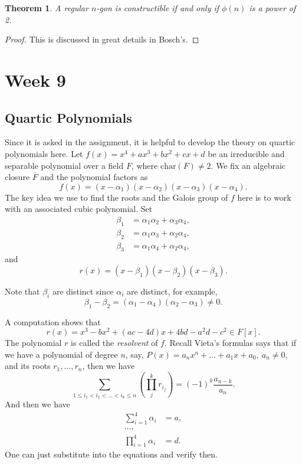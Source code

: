 \documentclass[12pt]{report}
\newtheorem{theorem}{Theorem}[section]
\theoremstyle{definition}
\newcommand{\charr}{\text{char}}
\begin{document}
\begin{theorem}
	A regular $n$-gon is constructible if and only if $\phi(n)$ is a power of 2.
\end{theorem}

\begin{proof}
	This is discussed in great details in Bosch's.
\end{proof}

\chapter*{Week 9}
\setcounter{chapter}{9}

\section{Quartic Polynomials}

Since it is asked in the assignment, it is helpful to develop the theory on quartic polynomials here. Let $f(x)=x^4+ax^3+bx^2+cx+d$ be an irreducible and separable polynomial over a field $F$, where $\charr(F)\not=2$. We fix an algebraic closure $\overline{F}$ and the polynomial factors as \[f(x)=(x-\alpha_1)(x-\alpha_2)(x-\alpha_3)(x-\alpha_4).\]
The key idea we use to find the roots and the Galois group of $f$ here is to work with an associated cubic polynomial. Set
\begin{align*}
	\beta_1 & =\alpha_1\alpha_2+\alpha_3\alpha_4,    \\
	\beta_2 & = \alpha_1\alpha_3 + \alpha_2\alpha_4, \\
	\beta_3 & =\alpha_1\alpha_4+\alpha_2\alpha_4,
\end{align*}
and \[r(x)=(x-\beta_1)(x-\beta_2)(x-\beta_3).\]

Note that $\beta_i$ are distinct since $\alpha_i$ are distinct, for example, $$\beta_1-\beta_2 = (\alpha_1-\alpha_4)(\alpha_2-\alpha_3)\not=0.$$

A computation shows that\[r(x)=x^3-bx^2+(ac-4d)x+4bd-a^2d-c^2\in F[x].\]
The polynomial $r$ is called the \emph{resolvent} of $f$. Recall Vieta's formulas says that if we have a polynomial of degree $n$, say, $P(x)=a_nx^n+\dots+a_1x+a_0,~a_n\not=0$, and its roots $r_1,\dots, r_n$, then we have \[\sum_{1\leq i_1<i_1<\dots<i_k\leq n} (\prod_j^k r_{i_j})=(-1)^k \frac{a_{n-k}}{a_n}.\]
And then we have \begin{align*}
	\sum_{i=1}^4 \alpha_i  & = a,    \\
	\dots,                           \\
	\prod_{i=1}^4 \alpha_i & =   d .
\end{align*}
One can just substitute into the equations and verify then.
\end{document}
